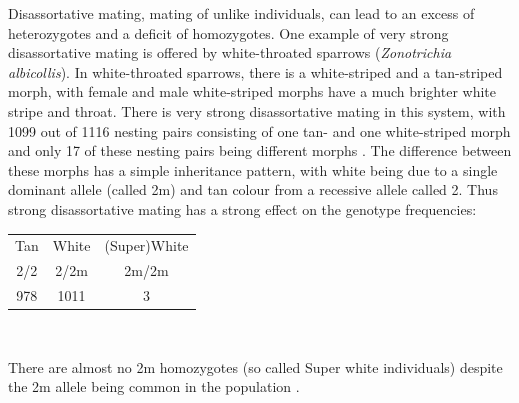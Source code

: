 {{Disassortative mating, mating of unlike individuals, can lead to
an excess of heterozygotes and a deficit of homozygotes.
One example of very strong disassortative mating is offered by
white-throated sparrows ({\it Zonotrichia albicollis}). 
In white-throated sparrows, there is a white-striped and a tan-striped
morph, with female and male white-striped morphs have a much brighter white stripe
and throat. There is very strong disassortative mating in this system, with 1099
out of 1116 nesting pairs consisting of one tan- and one white-striped
morph and only 17 of these
nesting pairs being different morphs \citep{tuttle2016divergence}. The
difference between these morphs has a simple inheritance pattern, with
white being due to a single dominant allele (called 2m) and tan colour from a recessive allele called
2. Thus strong disassortative mating has a strong effect on the
genotype frequencies:  \\
\begin{center}
\begin{tabular}{ccc}
  Tan & White & (Super)White \\
2/2  & 2/2m   & 2m/2m \\
978    & 1011 & 3 \\
\end{tabular}\\
\end{center}
There are almost no 2m homozygotes (so called Super
white individuals)
despite the 2m allele being common in the population \citep[data from
][ table S1]{tuttle2016divergence}.

}}
